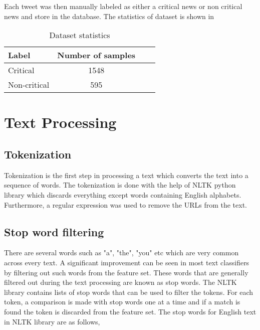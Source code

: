 Each tweet was then manually labeled as either a critical news or non critical news and store in the database. The statistics of dataset is shown in 

\begin{table}
\begin{center}
\caption{Dataset statistics}
\label{tbl:dataset_statistics}
\begin{tabular}{@{}lccc@{}}
\toprule 
\rule[-1pt]{0pt}{14pt}Label&Number of samples\\
\midrule 
\rule[-1pt]{0pt}{14pt}Critical&1548\\
\rule[-1pt]{0pt}{14pt}Non-critical&595\\
\bottomrule
\end{tabular}
\end{center}
\end{table}

\section{Text Processing}
\subsection{Tokenization}
Tokenization is the first step in processing a text which converts the text into a sequence of words. The tokenization is done with the help of NLTK\cite{loper2002nltk} python library which discards everything except words containing English alphabets. Furthermore, a regular expression was used to remove the URLs from the text.

\subsection{Stop word filtering}
There are several words such as "a", "the", "you" etc which are very common across every text. A significant improvement can be seen in most text classifiers by filtering out such words from the feature set\cite{silva2003importance}. These words that are generally filtered out during the text processing are known as stop words. The NLTK library contains lists of stop words that can be used to filter the tokens. For each token, a comparison is made with stop words one at a time and if a match is found the token is discarded from the feature set. The stop words for English text in NLTK library are as follows,

